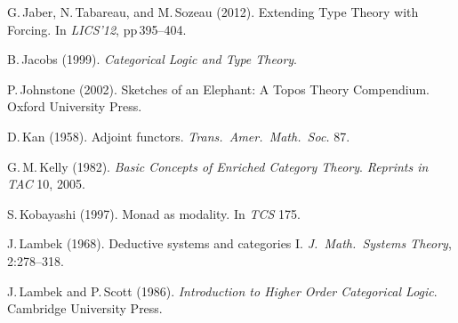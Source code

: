 \documentclass[11pt,twocolumn]{article}
\newcommand{\hide}[1]{}
\begin{document}
{\begin{thebibliography}{000}
\hide{
\bibitem{Hyland}
M.\,Hyland (1988).
\newblock A small complete category.
\newblock APAL 40.
}

G.\,Jaber, N.\,Tabareau, and M.\,Sozeau (2012).
\newblock Extending Type Theory with Forcing.
\newblock In \emph{LICS'12}, pp\,395--404.

B.\,Jacobs (1999).
\newblock \emph{Categorical Logic and Type Theory}.

P.\,Johnstone (2002).
\newblock Sketches of an Elephant: A Topos Theory Compendium. 
\newblock Oxford University Press.



D.\,Kan (1958).
\newblock Adjoint functors.
\newblock \emph{Trans.\ Amer.\ Math.\ Soc.} 87.

G.\,M.\,Kelly (1982).
\newblock \emph{Basic Concepts of Enriched Category Theory}.
\newblock \emph{Reprints in TAC} 10, 2005.


S.\,Kobayashi (1997).
\newblock Monad as modality.
\newblock In \emph{TCS} 175.

\hide{
\bibitem{KrivineRA}
J.-L.\,Krivine (2011).
\newblock Realizability algebras: a program to well order R.
\newblock \emph{LMCS}-7(3:2).
}

\hide{
\bibitem{Lafont}
Y.\,Lafont (1990).
\newblock Interaction nets.
\newblock In \emph{POPL'90}.
}

J.\,Lambek (1968).
\newblock Deductive systems and categories I.
\newblock \emph{J.\ Math.\ Systems Theory}, 2:278--318.


J.\,Lambek and P.\,Scott (1986).
\newblock \emph{Introduction to Higher Order Categorical Logic}.
\newblock Cambridge University Press.


\end{thebibliography}}
\end{document}
